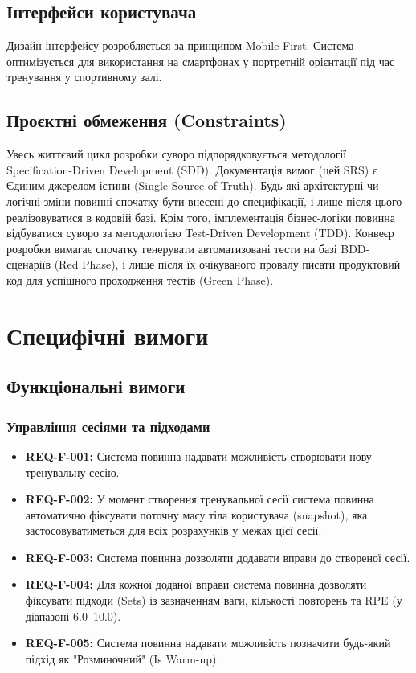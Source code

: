 \documentclass[12pt]{article}
\begin{document}
\subsection{Інтерфейси користувача}
Дизайн інтерфейсу розробляється за принципом Mobile-First. Система оптимізується для використання на смартфонах у портретній орієнтації під час тренування у спортивному залі.

\subsection{Проєктні обмеження (Constraints)}
Увесь життєвий цикл розробки суворо підпорядковується методології Specification-Driven Development (SDD). Документація вимог (цей SRS) є Єдиним джерелом істини (Single Source of Truth). Будь-які архітектурні чи логічні зміни повинні спочатку бути внесені до специфікації, і лише після цього реалізовуватися в кодовій базі.
Крім того, імплементація бізнес-логіки повинна відбуватися суворо за методологією Test-Driven Development (TDD). Конвеєр розробки вимагає спочатку генерувати автоматизовані тести на базі BDD-сценаріїв (Red Phase), і лише після їх очікуваного провалу писати продуктовий код для успішного проходження тестів (Green Phase).

\section{Специфічні вимоги}

\subsection{Функціональні вимоги}

\subsubsection*{Управління сесіями та підходами}
\begin{itemize}
    \item \textbf{REQ-F-001:} Система повинна надавати можливість створювати нову тренувальну сесію.
    \item \textbf{REQ-F-002:} У момент створення тренувальної сесії система повинна автоматично фіксувати поточну масу тіла користувача (snapshot), яка застосовуватиметься для всіх розрахунків у межах цієї сесії.
    \item \textbf{REQ-F-003:} Система повинна дозволяти додавати вправи до створеної сесії.
    \item \textbf{REQ-F-004:} Для кожної доданої вправи система повинна дозволяти фіксувати підходи (Sets) із зазначенням ваги, кількості повторень та RPE (у діапазоні 6.0--10.0).
    \item \textbf{REQ-F-005:} Система повинна надавати можливість позначити будь-який підхід як "Розминочний" (Is Warm-up).
\end{itemize}
\end{document}
